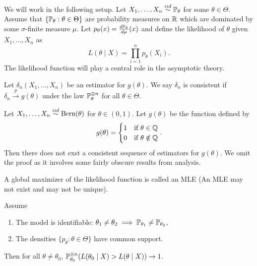 We will work in the following setup. Let $X_1, \dots, X_n \overset{iid}{\sim} \mathbb{P}_\theta$ for some $\theta \in \Theta$. Assume that $\{\mathbb{P}_\theta : \theta \in \Theta \}$ are probability measures on $\mathbb{R}$ which are dominated by some $\sigma$-finite measure $\mu$. Let $p_\theta(x) = \frac{d\mathbb{P}_\theta}{d\mu}(x)$ and define the likelihood of $\theta$ given $X_1, \dots, X_n$ as \[
	L(\theta \mid X) = \prod_{i=1}^n p_\theta(X_i).
\]
The likelihood function will play a central role in the asymptotic theory. 

\begin{definition}
	Let $\delta_n(X_1, \dots, X_n)$ be an estimator for $g(\theta)$. We say $\delta_n$ is consistent if $\delta_n \overset{p}{\to} g(\theta)$ under the law $\mathbb{P}_\theta^{\otimes n}$ for all $\theta \in \Theta$.
\end{definition}

\begin{example}
	Let $X_1, \dots, X_n \overset{iid}{\sim} \text{Bern}(\theta)$ for $\theta \in (0, 1)$. Let $g(\theta)$ be the function defined by \[
		g(\theta) = \begin{cases}
			1 & \text{if } \theta \in \mathbb{Q} \\
			0 & \text{if } \theta \notin  \mathbb{Q}
		\end{cases}.
	\] Then there does not exst a consistent sequence of estimators for $g(\theta)$. We omit the proof as it involves some fairly obscure results from analysis.
\end{example}

\begin{definition}
	A global maximizer of the likelihood function is called an MLE (An MLE may not exist and may not be unique).
\end{definition}

\begin{lemma}
Assume  
\begin{enumerate}
	\item[(A0)] The model is identifiable: $\theta_1 \neq \theta_2 \implies \mathbb{P}_{\theta_1} \neq \mathbb{P}_{\theta_2}$,
	\item[(A1)]  The densities $\{p_\theta : \theta \in \Theta \}$ have common support.
\end{enumerate}	
Then for all $\theta \neq \theta_0$, $\mathbb{P}^{\otimes n}_{\theta_0}(L(\theta_0 \mid X) > L(\theta \mid X)) \to 1$.
\end{lemma}

